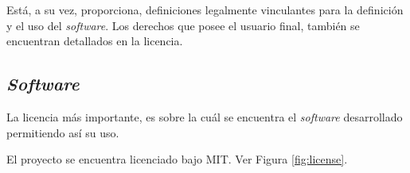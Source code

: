 Está, a su vez, proporciona, definiciones legalmente vinculantes para la definición y el uso del \textit{software}. Los derechos que posee el usuario final, también se encuentran detallados en la licencia.

\clearpage
\subsection{\textit{Software}}
La licencia más importante, es sobre la cuál se encuentra el \textit{software} desarrollado permitiendo así su uso.

El proyecto se encuentra licenciado bajo MIT. Ver Figura \ref{fig:license}.
